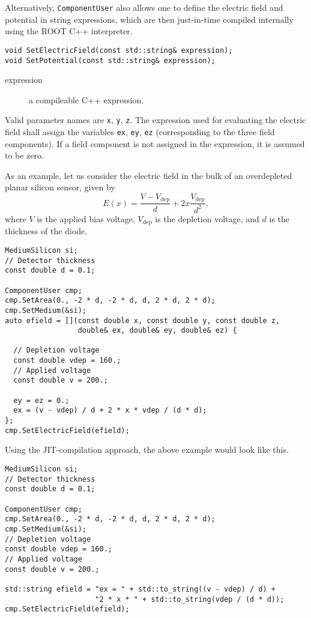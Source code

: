 Alternatively, \texttt{ComponentUser} also allows one to define the 
electric field and potential in string expressions, which are then
just-in-time compiled internally using the ROOT C++ interpreter.
\begin{lstlisting}
void SetElectricField(const std::string& expression);
void SetPotential(const std::string& expression);
\end{lstlisting}
\begin{description}
  \item[expression] a compileable C++ expression.
\end{description}
Valid parameter names are \texttt{x}, \texttt{y}, \texttt{z}. 
The expression used for evaluating the electric field 
shall assign the variables \texttt{ex}, \texttt{ey}, \texttt{ez} 
(corresponding to the three field components). 
If a field component is not assigned in the expression, it is assumed 
to be zero.

As an example, let us consider the electric field in the bulk 
of an overdepleted planar silicon sensor, given by
\begin{equation*}
E\left(x\right) = \frac{V - V_{\text{dep}}}{d} + 
                    2x \frac{V_{\text{dep}}}{d^{2}},
\end{equation*}
where \(V\) is the applied bias voltage, \(V_{\text{dep}}\) is 
the depletion voltage, and \(d\) is the thickness of the diode.
\begin{lstlisting}
MediumSilicon si;
// Detector thickness
const double d = 0.1;

ComponentUser cmp;
cmp.SetArea(0., -2 * d, -2 * d, d, 2 * d, 2 * d);
cmp.SetMedium(&si);
auto efield = [](const double x, const double y, const double z,
                 double& ex, double& ey, double& ez) { 

  // Depletion voltage
  const double vdep = 160.;
  // Applied voltage
  const double v = 200.;

  ey = ez = 0.;
  ex = (v - vdep) / d + 2 * x * vdep / (d * d);
};
cmp.SetElectricField(efield);
\end{lstlisting}

Using the JIT-compilation approach, the above example would look like this.
\begin{lstlisting}
MediumSilicon si;
// Detector thickness
const double d = 0.1;

ComponentUser cmp;
cmp.SetArea(0., -2 * d, -2 * d, d, 2 * d, 2 * d);
cmp.SetMedium(&si);
// Depletion voltage
const double vdep = 160.;
// Applied voltage
const double v = 200.;

std::string efield = "ex = " + std::to_string((v - vdep) / d) + 
                     "2 * x * " + std::to_string(vdep / (d * d));
cmp.SetElectricField(efield);
\end{lstlisting}

